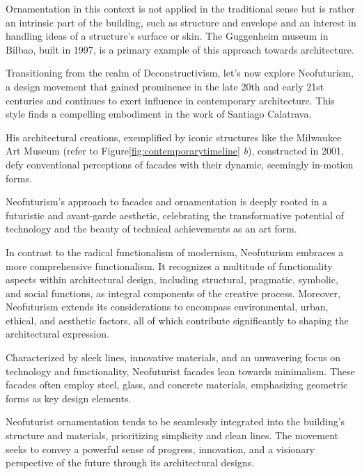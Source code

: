 Ornamentation in this context is not applied in the traditional sense but is rather an intrinsic part of the building, such as structure and envelope and an interest in handling ideas of a structure’s surface or skin\cite{Clement2017}.
The Guggenheim museum in Bilbao, built in 1997, is a primary example of this approach towards architecture.


Transitioning from the realm of Deconstructivism, let's now explore Neofuturism, a design movement that gained prominence in the late 20th and early 21st centuries and continues to exert influence in contemporary architecture.
This style finds a compelling embodiment in the work of Santiago Calatrava\cite{Omale2016}.

His architectural creations, exemplified by iconic structures like the Milwaukee Art Museum (refer to Figure\ref{fig:contemporarytimeline} \textit{b}), constructed in 2001, defy conventional perceptions of facades with their dynamic, seemingly in-motion forms\cite{Tyc2018}.

Neofuturism's approach to facades and ornamentation is deeply rooted in a futuristic and avant-garde aesthetic, celebrating the transformative potential of technology and the beauty of technical achievements as an art form\cite{Tyc2018}.

In contrast to the radical functionalism of modernism, Neofuturism embraces a more comprehensive functionalism.
It recognizes a multitude of functionality aspects within architectural design, including structural, pragmatic, symbolic, and social functions, as integral components of the creative process.
Moreover, Neofuturism extends its considerations to encompass environmental, urban, ethical, and aesthetic factors, all of which contribute significantly to shaping the architectural expression\cite{Omale2016}.

Characterized by sleek lines, innovative materials, and an unwavering focus on technology and functionality, Neofuturist facades lean towards minimalism.
These facades often employ steel, glass, and concrete materials, emphasizing geometric forms as key design elements.

Neofuturist ornamentation tends to be seamlessly integrated into the building's structure and materials, prioritizing simplicity and clean lines.
The movement seeks to convey a powerful sense of progress, innovation, and a visionary perspective of the future through its architectural designs.

